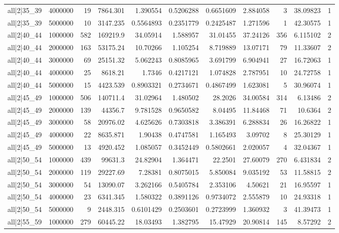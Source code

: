 \begin{tabular}{lrrrrrrrrrr}
all|2|35\_39 & 4000000 & 19 & 7864.301 & 1.390554 & 0.5206288 & 0.6651609 & 2.884058 & 3 & 38.09823 & 1 \\
all|2|35\_39 & 5000000 & 10 & 3147.235 & 0.5564893 & 0.2351779 & 0.2425487 & 1.271596 & 1 & 42.30575 & 1 \\
all|2|40\_44 & 1000000 & 582 & 169219.9 & 34.05914 & 1.588957 & 31.01455 & 37.24126 & 356 & 6.115102 & 2 \\
all|2|40\_44 & 2000000 & 163 & 53175.24 & 10.70266 & 1.105254 & 8.719889 & 13.07171 & 79 & 11.33607 & 2 \\
all|2|40\_44 & 3000000 & 69 & 25151.32 & 5.062243 & 0.8085965 & 3.691799 & 6.904941 & 27 & 16.72063 & 1 \\
all|2|40\_44 & 4000000 & 25 & 8618.21 & 1.7346 & 0.4217121 & 1.074828 & 2.787951 & 10 & 24.72758 & 1 \\
all|2|40\_44 & 5000000 & 15 & 4423.539 & 0.8903321 & 0.2734671 & 0.4867499 & 1.623081 & 5 & 30.96074 & 1 \\
all|2|45\_49 & 1000000 & 506 & 140711.4 & 31.02964 & 1.480502 & 28.2026 & 34.00584 & 314 & 6.13486 & 2 \\
all|2|45\_49 & 2000000 & 139 & 44356.7 & 9.781528 & 0.9650582 & 8.04495 & 11.84468 & 71 & 10.6364 & 2 \\
all|2|45\_49 & 3000000 & 58 & 20976.02 & 4.625626 & 0.7303818 & 3.386391 & 6.288834 & 26 & 16.26822 & 1 \\
all|2|45\_49 & 4000000 & 22 & 8635.871 & 1.90438 & 0.4747581 & 1.165493 & 3.09702 & 8 & 25.30129 & 1 \\
all|2|45\_49 & 5000000 & 13 & 4920.452 & 1.085057 & 0.3452449 & 0.5802661 & 2.020057 & 4 & 32.04367 & 1 \\
all|2|50\_54 & 1000000 & 439 & 99631.3 & 24.82904 & 1.364471 & 22.2501 & 27.60079 & 270 & 6.431834 & 2 \\
all|2|50\_54 & 2000000 & 119 & 29227.69 & 7.28381 & 0.8075015 & 5.850084 & 9.035192 & 53 & 11.58815 & 2 \\
all|2|50\_54 & 3000000 & 54 & 13090.07 & 3.262166 & 0.5405784 & 2.353106 & 4.50621 & 21 & 16.95597 & 1 \\
all|2|50\_54 & 4000000 & 23 & 6341.345 & 1.580322 & 0.3891126 & 0.9734072 & 2.555879 & 10 & 24.93318 & 1 \\
all|2|50\_54 & 5000000 & 9 & 2448.315 & 0.6101429 & 0.2503601 & 0.2723999 & 1.360932 & 3 & 41.39473 & 1 \\
all|2|55\_59 & 1000000 & 279 & 60445.22 & 18.03493 & 1.382795 & 15.47929 & 20.90814 & 145 & 8.57292 & 2 \\

\end{tabular}
